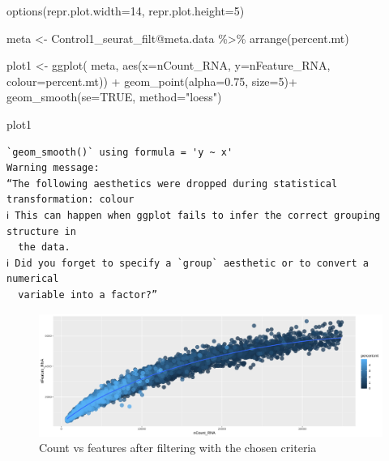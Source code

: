 \documentclass[
  letterpaper,
  DIV=11,
  numbers=noendperiod]{scrartcl}
\newenvironment{Shaded}{\begin{snugshade}}{\end{snugshade}}
\newcommand{\AttributeTok}[1]{\textcolor[rgb]{0.49,0.56,0.16}{#1}}
\newcommand{\ConstantTok}[1]{\textcolor[rgb]{0.53,0.00,0.00}{#1}}
\newcommand{\DecValTok}[1]{\textcolor[rgb]{0.25,0.63,0.44}{#1}}
\newcommand{\FloatTok}[1]{\textcolor[rgb]{0.25,0.63,0.44}{#1}}
\newcommand{\FunctionTok}[1]{\textcolor[rgb]{0.02,0.16,0.49}{#1}}
\newcommand{\NormalTok}[1]{\textcolor[rgb]{0.00,0.44,0.13}{#1}}
\newcommand{\OtherTok}[1]{\textcolor[rgb]{0.00,0.44,0.13}{#1}}
\newcommand{\SpecialCharTok}[1]{\textcolor[rgb]{0.25,0.44,0.63}{#1}}
\newcommand{\StringTok}[1]{\textcolor[rgb]{0.25,0.44,0.63}{#1}}
\begin{document}
\begin{Shaded}
\begin{Highlighting}[]
\FunctionTok{options}\NormalTok{(}\AttributeTok{repr.plot.width=}\DecValTok{14}\NormalTok{, }\AttributeTok{repr.plot.height=}\DecValTok{5}\NormalTok{)}

\NormalTok{meta }\OtherTok{\textless{}{-}}\NormalTok{ Control1\_seurat\_filt}\SpecialCharTok{@}\NormalTok{meta.data }\SpecialCharTok{\%\textgreater{}\%} \FunctionTok{arrange}\NormalTok{(percent.mt)}

\NormalTok{plot1 }\OtherTok{\textless{}{-}} \FunctionTok{ggplot}\NormalTok{( meta, }\FunctionTok{aes}\NormalTok{(}\AttributeTok{x=}\NormalTok{nCount\_RNA, }\AttributeTok{y=}\NormalTok{nFeature\_RNA, }\AttributeTok{colour=}\NormalTok{percent.mt)) }\SpecialCharTok{+} 
         \FunctionTok{geom\_point}\NormalTok{(}\AttributeTok{alpha=}\FloatTok{0.75}\NormalTok{, }\AttributeTok{size=}\DecValTok{5}\NormalTok{)}\SpecialCharTok{+}
         \FunctionTok{geom\_smooth}\NormalTok{(}\AttributeTok{se=}\ConstantTok{TRUE}\NormalTok{, }\AttributeTok{method=}\StringTok{"loess"}\NormalTok{)}

\NormalTok{plot1}
\end{Highlighting}
\end{Shaded}

\begin{verbatim}
`geom_smooth()` using formula = 'y ~ x'
Warning message:
“The following aesthetics were dropped during statistical transformation: colour
ℹ This can happen when ggplot fails to infer the correct grouping structure in
  the data.
ℹ Did you forget to specify a `group` aesthetic or to convert a numerical
  variable into a factor?”
\end{verbatim}

\begin{figure}[H]

{\centering \includegraphics{notebook_files/figure-pdf/fig-filtrelationship-output-2.png}

}

\caption{\label{fig-filtrelationship}Count vs features after filtering
with the chosen criteria}

\end{figure}
\end{document}
